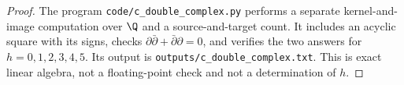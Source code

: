 \begin{proof}
The program \texttt{code/c\_double\_complex.py} performs a separate
kernel-and-image computation over $\Q$ and a source-and-target
count.  It includes an acyclic square with its signs, checks
$\partial\bar\partial+\bar\partial\partial=0$, and verifies the
two answers for $h=0,1,2,3,4,5$.  Its output is
\texttt{outputs/c\_double\_complex.txt}.  This is exact linear
algebra, not a floating-point check and not a determination of $h$.
\end{proof}
